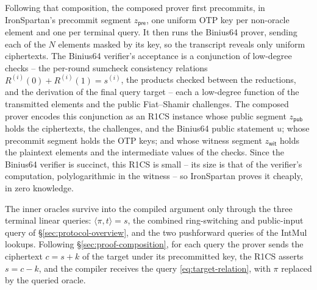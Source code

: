\documentclass{article}
\theoremstyle{definition}
\begin{document}
Following that composition, the composed prover first precommits, in IronSpartan's precommit segment $z_{\textsf{pre}}$, one uniform OTP key per non-oracle element and one per terminal query. It then runs the Binius64 prover, sending each of the $N$ elements masked by its key, so the transcript reveals only uniform ciphertexts. The Binius64 verifier's acceptance is a conjunction of low-degree checks -- the per-round sumcheck consistency relations $R^{(i)}(0) + R^{(i)}(1) = s^{(i)}$, the products checked between the reductions, and the derivation of the final query target -- each a low-degree function of the transmitted elements and the public Fiat--Shamir challenges. The composed prover encodes this conjunction as an R1CS instance whose public segment $z_{\textsf{pub}}$ holds the ciphertexts, the challenges, and the Binius64 public statement $u$; whose precommit segment holds the OTP keys; and whose witness segment $z_{\textsf{wit}}$ holds the plaintext elements and the intermediate values of the checks. Since the Binius64 verifier is succinct, this R1CS is small -- its size is that of the verifier's computation, polylogarithmic in the witness -- so IronSpartan proves it cheaply, in zero knowledge.

The inner oracles survive into the compiled argument only through the three terminal linear queries: $\langle \pi, t \rangle = s$, the combined ring-switching and public-input query of \S\ref{sec:protocol-overview}, and the two pushforward queries of the IntMul lookups. Following \S\ref{sec:proof-composition}, for each query the prover sends the ciphertext $c = s + k$ of the target under its precommitted key, the R1CS asserts $s = c - k$, and the compiler receives the query \eqref{eq:target-relation}, with $\pi$ replaced by the queried oracle.
\end{document}
